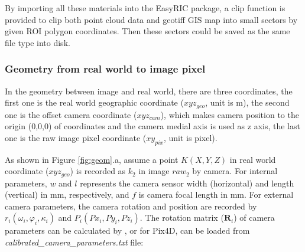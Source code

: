 \documentclass[doublespacing]{configs/bmcart}
\begin{document}
By importing all these materials into the EasyRIC package, a clip function is provided to clip both point cloud data and geotiff GIS map into small sectors by given ROI polygon coordinates. Then these sectors could be saved as the same file type into disk.

\subsubsection*{Geometry from real world to image pixel}
In the geometry between image and real world, there are three coordinates, the first one is the real world geographic coordinate ($xyz_{geo}$, unit is m), the second one is the offset camera coordinate ($xyz_{cam}$), which makes camera position to the origin (0,0,0) of coordinates and the camera medial axis is used as z axis, the last one is the raw image pixel coordinate ($xy_{pix}$, unit is pixel). 

As shown in Figure \ref{fig:geom}.a, assume a point $K(X,Y,Z)$ in real world coordinate ($xyz_{geo}$) is recorded as $k_2$ in image $raw_2$ by camera. For internal parameters, $w$ and $l$ represents the camera sensor width (horizontal) and length (vertical) in mm, respectively, and $f$ is camera focal length in mm. For external camera parameters, the camera rotation and position are recorded by $r_i (\omega_i, \varphi_i, \kappa_i)$ \cite{pix4d_support_yaw_2020} and $P_i (Px_{i}, Py_{i}, Pz_{i})$. The rotation matrix ($\mathbf{R}_i$) of camera parameters 
can be calculated by \cite{pix4d_support_how_2020}, or for Pix4D, can be loaded from \textit{calibrated\_camera\_parameters.txt} file:
\end{document}
